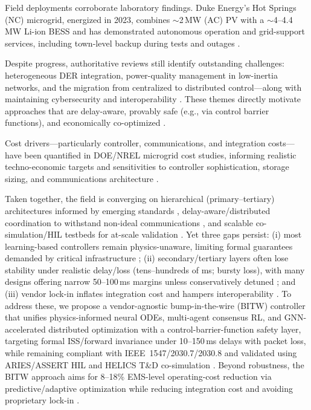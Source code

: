 \documentclass[12pt]{article}
\begin{document}
Field deployments corroborate laboratory findings. Duke Energy's Hot Springs (NC) microgrid, energized in 2023, combines $\sim$2\,MW (AC) PV with a $\sim$4--4.4\,MW Li-ion BESS and has demonstrated autonomous operation and grid-support services, including town-level backup during tests and outages \cite{Duke2023HotSpringsPR,TDWorld2023HotSprings}.

Despite progress, authoritative reviews still identify outstanding challenges: heterogeneous DER integration, power-quality management in low-inertia networks, and the migration from centralized to distributed control---along with maintaining cybersecurity and interoperability \cite{Hirsch2018RSER}. These themes directly motivate approaches that are delay-aware, provably safe (e.g., via control barrier functions), and economically co-optimized \cite{Ames2019CBF}.

Cost drivers---particularly controller, communications, and integration costs---have been quantified in DOE/NREL microgrid cost studies, informing realistic techno-economic targets and sensitivities to controller sophistication, storage sizing, and communications architecture \cite{NREL2018CostStudy}.

Taken together, the field is converging on hierarchical (primary--tertiary) architectures informed by emerging standards \cite{Guerrero2011Hierarchical,IEEE1547_2018,IEEE20307_2017,IEEE20308_2018}, delay-aware/distributed coordination to withstand non-ideal communications \cite{Liu2015DelaySecondary,Lu2017DistributedSecondary}, and scalable co-simulation/HIL testbeds for at-scale validation \cite{Hardy2024HELICS,Zheng2024ITD,Chanda2023ASSERT}. Yet three gaps persist: (i) most learning-based controllers remain physics-unaware, limiting formal guarantees demanded by critical infrastructure \cite{Hirsch2018RSER,Ames2019CBF}; (ii) secondary/tertiary layers often lose stability under realistic delay/loss (tens--hundreds of ms; bursty loss), with many designs offering narrow 50--100\,ms margins unless conservatively detuned \cite{Liu2015DelaySecondary,Lu2017DistributedSecondary}; and (iii) vendor lock-in inflates integration cost and hampers interoperability \cite{NREL2018CostStudy,IEEE20307_2017}. To address these, we propose a vendor-agnostic bump-in-the-wire (BITW) controller that unifies physics-informed neural ODEs, multi-agent consensus RL, and GNN-accelerated distributed optimization with a control-barrier-function safety layer, targeting formal ISS/forward invariance under 10--150\,ms delays with packet loss, while remaining compliant with IEEE~1547/2030.7/2030.8 and validated using ARIES/ASSERT HIL and HELICS T\&D co-simulation \cite{IEEE1547_2018,IEEE20307_2017,IEEE20308_2018,Chanda_ASSERT_ATEE_2023,NREL_ARIES_Capabilities_2025,NREL_ARIES_ResearchPlan_2021,Hardy2024HELICS,Zheng2024ITD}. Beyond robustness, the BITW approach aims for 8--18\% EMS-level operating-cost reduction via predictive/adaptive optimization \cite{GarciaTorres2021MPCReview,Singh2025SciRep} while reducing integration cost and avoiding proprietary lock-in \cite{NREL2018CostStudy}.
\vspace{-0.5cm}
\end{document}
